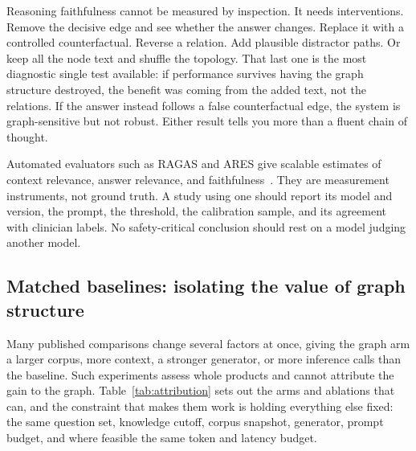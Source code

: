Reasoning faithfulness cannot be measured by inspection. It needs interventions. Remove the decisive edge and see whether the answer changes. Replace it with a controlled counterfactual. Reverse a relation. Add plausible distractor paths. Or keep all the node text and shuffle the topology. That last one is the most diagnostic single test available: if performance survives having the graph structure destroyed, the benefit was coming from the added text, not the relations. If the answer instead follows a false counterfactual edge, the system is graph-sensitive but not robust. Either result tells you more than a fluent chain of thought.

Automated evaluators such as RAGAS and ARES give scalable estimates of context relevance, answer relevance, and faithfulness~\cite{es2024ragas,saadfalcon2024ares}. They are measurement instruments, not ground truth. A study using one should report its model and version, the prompt, the threshold, the calibration sample, and its agreement with clinician labels. No safety-critical conclusion should rest on a model judging another model.

\subsection{Matched baselines: isolating the value of graph structure}

Many published comparisons change several factors at once, giving the graph arm a larger corpus, more context, a stronger generator, or more inference calls than the baseline. Such experiments assess whole products and cannot attribute the gain to the graph. Table~\ref{tab:attribution} sets out the arms and ablations that can, and the constraint that makes them work is holding everything else fixed: the same question set, knowledge cutoff, corpus snapshot, generator, prompt budget, and where feasible the same token and latency budget.

